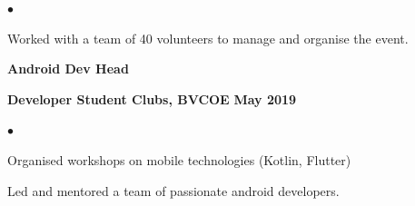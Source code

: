 \documentclass[10pt,a4paper]{extarticle}
\newcommand{\myExtrasBox}[1]{
	\begin{tikzpicture}
		\node [myExtraBox] (box){%
			\color{resumeBlueDark}{\begin{footnotesize}
					\MakeUppercase{#1}
				\end{footnotesize}}};
	\end{tikzpicture}
}
\newcommand{\mySectionTitle}[1]{{\color{resumeBlueLight}%
			\section*{%
			  \begin{large}%
				  #1%
			  \end{large}%
            }
		}
}
\newcommand{\myAchievement}[4][ ]{
	#2\hfill{\color{darkgray}\textbf{#1}}\\
	\begin{small}{
			\color{resumeBlueDark}
			\textbf{#3}
		}
		\hfill%
		{
			\color{gray}\textbf{#4}
		}
	\end{small}}
\newcommand{\myVolunCertiItem}[4][]{
\begin{flushleft}
	\textbf{#2}\\
	\begin{small}
		{\color{resumeBlueDark}\textbf{#3}}\hfill%
		{\color{gray}\textbf{#4}}
	\end{small}
\end{flushleft}
{#1}
}
\begin{document}
\begin{minipage}{0.55\textwidth}
{		\vspace{-6mm}
		\begin{list}{\color{resumeBlueLight}$\bullet$}{\leftmargin 3mm}
			\item{Worked with a team of 40 volunteers to manage and organise the event.}
		\end{list}
	}
	\myVolunCertiItem{Android Dev Head}{Developer Student Clubs, BVCOE}{May 2019}{
		\vspace{-6mm}
		\begin{list}{\color{resumeBlueLight}$\bullet$}{\leftmargin 3mm}
			\item{Organised workshops on mobile technologies (Kotlin, Flutter)}
			\vspace{-2mm}
			\item{Led and mentored a team of passionate
			            android developers.}
		\end{list}
	}


\end{minipage}
\end{document}
